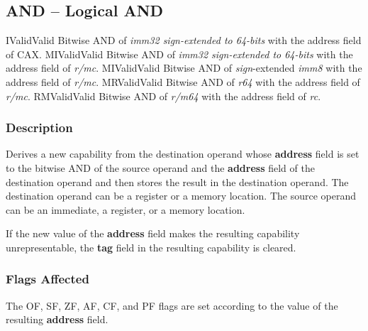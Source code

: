 \clearpage
{}
{}
\subsection*{AND -- Logical AND}

\begin{x86opcodetable}
  {I}{Valid}{Valid}
  {Bitwise AND of \emph{imm32 sign-extended to 64-bits} with the
    address field of CAX.}
  {MI}{Valid}{Valid}
  {Bitwise AND of \emph{imm32 sign-extended to 64-bits} with the
    address field of \emph{r/mc}.}
  {MI}{Valid}{Valid}
  {Bitwise AND of \emph{sign}-extended \emph{imm8} with the address
    field of \emph{r/mc}.}
  {MR}{Valid}{Valid}
  {Bitwise AND of \emph{r64} with the address field of \emph{r/mc}.}
  {RM}{Valid}{Valid}
  {Bitwise AND of \emph{r/m64} with the address field of \emph{rc}.}
\end{x86opcodetable}

\begin{x86opentable}
\end{x86opentable}

\subsubsection*{Description}

Derives a new capability from the destination operand whose
\textbf{address} field is set to the bitwise AND of the source operand
and the \textbf{address} field of the destination operand and then
stores the result in the destination operand. The destination operand
can be a register or a memory location. The source operand can be an
immediate, a register, or a memory location.

If the new value of the \textbf{address} field makes the resulting
capability unrepresentable, the \textbf{tag} field in the resulting
capability is cleared.

\subsubsection*{Flags Affected}

The OF, SF, ZF, AF, CF, and PF flags are set according to the value of
the resulting \textbf{address} field.
